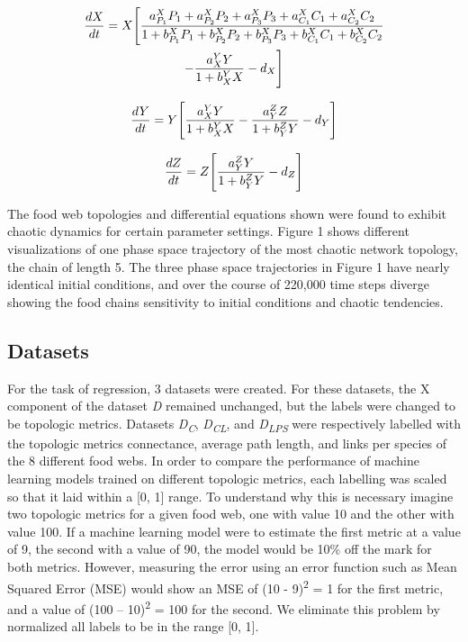 \documentclass[letterpaper, 10 pt, conference]{ieeeconf}  %
\begin{document}
\begin{multline}
	\frac{dX}{dt} =
   		X\Bigg{[} 
        \frac{{a_{P_1}^{X}P_1 + a_{P_2}^{X}P_2 + a_{P_3}^{X}P_3 + a_{C_1}^{X}C_1 + a_{C_2}^{X}C_2}}{{1 + b_{P_1}^{X}P_1 + b_{P_2}^{X}P_2 + b_{P_3}^{X}P_3 + b_{C_1}^{X}C_1 + b_{C_2}^{X}C_2}} \\ 
        - \frac{a_X^YY}{1 + b_X^YX} - d_X
        \Bigg{]}
\end{multline}

\begin{equation}
	\frac{dY}{dt} =
    Y\Bigg{[}
    	\frac{a_X^YY}{1 + b_X^YX} - \frac{a_Y^ZZ}{1 + b_Y^ZY} - d_Y
    \Bigg{]}
\end{equation}

\begin{equation}
	\frac{dZ}{dt} =
    Z\Bigg{[}
    	\frac{a_Y^ZY}{1 + b_Y^ZY}  - d_Z
    \Bigg{]}
\end{equation}


The food web topologies and differential equations shown were found to exhibit chaotic dynamics for certain parameter settings. Figure 1 shows different visualizations of one phase space trajectory of the most chaotic network topology, the chain of length 5. The three phase space trajectories in Figure 1 have nearly identical initial conditions, and over the course of 220,000 time steps diverge showing the food chains sensitivity to initial conditions and chaotic tendencies.

\subsection{Datasets}
For the task of regression, 3 datasets were created. For these datasets, the X component of the dataset \textit{D} remained unchanged, but the labels were changed to be topologic metrics. Datasets \textit{D\textsubscript{C}},  \textit{D\textsubscript{CL}}, and  \textit{D\textsubscript{LPS}} were respectively labelled with the topologic metrics connectance, average path length, and links per species of the 8 different food webs. In order to compare the performance of machine learning models trained on different topologic metrics, each labelling was scaled so that it laid within a [0, 1] range. To understand why this is necessary imagine two topologic metrics for a given food web, one with value 10 and the other with value 100. If a machine learning model were to estimate the first metric at a value of 9, the second with a value of 90, the model would be 10\% off the mark for both metrics. However, measuring the error using an error function such as Mean Squared Error (MSE) would show an MSE of (10 - 9)\textsuperscript{2} = 1 for the first metric, and a value of (100 – 10)\textsuperscript{2} = 100 for the second. We eliminate this problem by normalized all labels to be in the range [0, 1]. 
\end{document}
